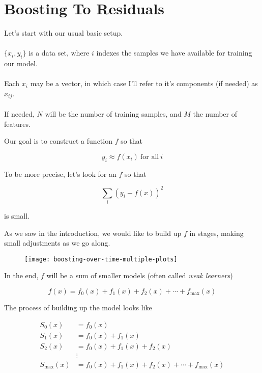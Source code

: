 \section{Boosting To Residuals}

\begin{frame}
Let's start with our usual basic setup.\\~\\

$\{ x_i, y_i \}$ is a data set, where $i$ indexes the samples we have available for training our model.\\~\\

Each $x_i$ may be a vector, in which case I'll refer to it's components (if needed) as $x_{ij}$.\\~\\

If needed, $N$ will be the number of training samples, and $M$ the number of features.
\end{frame}
%

\begin{frame}
Our goal is to construct a function $f$ so that

$$ y_i \approx f(x_i) \ \text{for all} \ i $$

\end{frame}
%

\begin{frame}
To be more precise, let's look for an $f$ so that 

$$ \sum_i \left( y_i - f(x) \right)^2 $$

is small.
\end{frame}
%

\begin{frame}
As we saw in the introduction, we would like to build up $f$ in stages, making small adjustments as we go along.

  \begin{figure}
    \texttt{[image: boosting-over-time-multiple-plots]}
  \end{figure}
  
\end{frame}
%

\begin{frame}
In the end, $f$ will be a sum of smaller models (often called \textit{weak learners})

$$ f(x) = f_0(x) + f_1(x) + f_2(x) + \cdots + f_{\text{max}}(x) $$

The process of building up the model looks like

\begin{align*}
    S_0(x) &= f_0(x) \\
    S_1(x) &= f_0(x) + f_1(x) \\
    S_2(x) &= f_0(x) + f_1(x) + f_2(x) \\
    &\vdots \\
    S_{\text{max}}(x) &= f_0(x) + f_1(x) + f_2(x) + \cdots + f_{\text{max}}(x) \\
\end{align*}
\end{frame} 
%

